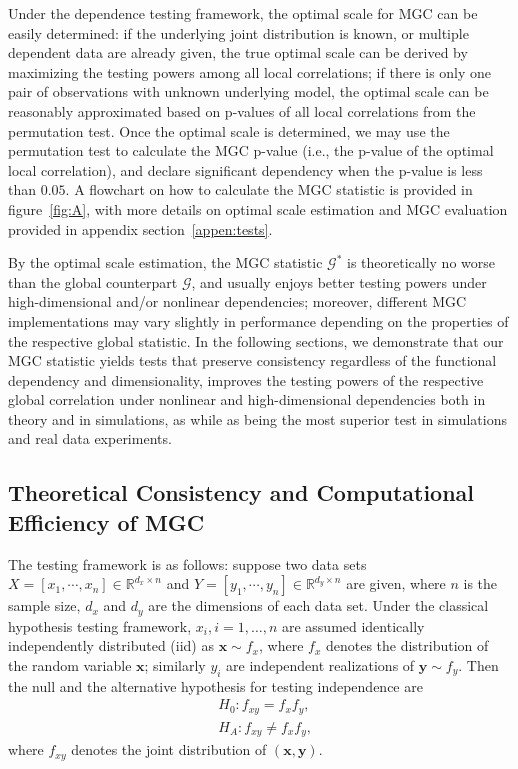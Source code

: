 \documentclass[11pt]{article}
\providecommand{\mb}[1]{\boldsymbol{#1}}
\newcommand{\Real}{\mathbb{R}}
\newcommand{\G}{\mathcal{G}}
\begin{document}
Under the dependence testing framework, the optimal scale for MGC can be easily determined: if the underlying joint distribution is known, or multiple dependent data are already given, the true optimal scale can be derived by maximizing the testing powers among all local correlations; if there is only one pair of observations with unknown underlying model, the optimal scale can be reasonably approximated based on p-values of all local correlations from the permutation test. Once the optimal scale is determined, we may use the permutation test to calculate the MGC p-value (i.e., the p-value of the optimal local correlation), and declare significant dependency when the p-value is less than $0.05$. A flowchart on how to calculate the MGC statistic is provided in figure~\ref{fig:A}, with more details on optimal scale estimation and MGC evaluation provided in appendix section~\ref{appen:tests}.

By the optimal scale estimation, the MGC statistic $\G^{*}$ is theoretically no worse than the global counterpart $\G$, and usually enjoys better testing powers under high-dimensional and/or nonlinear dependencies; moreover, different MGC implementations may vary slightly in performance depending on the properties of the respective global statistic. In the following sections, we demonstrate that our MGC statistic yields tests that preserve consistency regardless of the functional dependency and dimensionality, improves the testing powers of the respective global correlation under nonlinear and high-dimensional dependencies both in theory and in simulations, as while as being the most superior test in simulations and real data experiments.

\subsection{Theoretical Consistency and Computational Efficiency of MGC}
\label{main2}
The testing framework is as follows: suppose two data sets $X=[x_{1},\cdots, x_{n}] \in \Real^{d_{x} \times n}$ and $Y=[y_{1},\cdots, y_{n}] \in \Real^{d_{y} \times n}$ are given, where $n$ is the sample size, $d_{x}$ and $d_{y}$ are the dimensions of each data set. Under the classical hypothesis testing framework, $x_{i}, i=1,\ldots,n$ are assumed identically independently distributed (iid) as $\mb{x} \sim f_{x}$, where $f_{x}$ denotes the distribution of the random variable $\mb{x}$; similarly $y_{i}$ are independent realizations of $\mb{y} \sim f_{y}$. Then the null and the alternative hypothesis for testing independence are
\begin{align*}
& H_{0}: f_{xy}=f_{x}f_{y},\\
& H_{A}: f_{xy} \neq f_{x}f_{y},
\end{align*}
where $f_{xy}$ denotes the joint distribution of $(\mb{x},\mb{y})$. 
\end{document}
